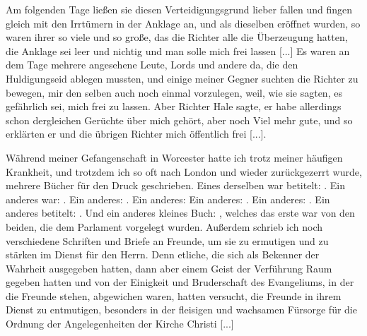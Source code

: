 Am folgenden Tage ließen sie diesen Verteidigungsgrund
lieber fallen und fingen gleich mit den Irrtümern in der Anklage
an, und als dieselben eröffnet wurden, so waren ihrer so viele
und so große, das die Richter alle die Überzeugung hatten,
die Anklage sei leer und nichtig und man solle mich frei
lassen [...] Es waren an dem Tage mehrere angesehene Leute,
Lords und andere da, die den Huldigungseid ablegen mussten, und
einige meiner Gegner suchten die Richter zu bewegen, mir den
selben auch noch einmal vorzulegen, weil, wie sie sagten, es 
gefährlich sei, mich frei zu lassen. Aber Richter Hale sagte, er habe
allerdings schon dergleichen Gerüchte über mich gehört, aber noch
Viel mehr gute, und so erklärten er und die übrigen Richter mich
öffentlich frei [...].

Während meiner Gefangenschaft in Worcester hatte ich trotz
meiner häufigen Krankheit, und trotzdem ich so oft nach London
und wieder zurückgezerrt wurde, mehrere Bücher für den Druck
geschrieben. Eines derselben war betitelt: . Ein anderes war: .
Ein anderes: . Ein anderes: 
 Ein anderes: . Ein anderes:
. Ein anderes
betitelt: . Und ein anderes kleines
Buch: , welches 
das erste war von den beiden,
die dem Parlament vorgelegt wurden. Außerdem schrieb ich noch
verschiedene Schriften und Briefe an Freunde, um sie zu 
ermutigen und zu stärken im Dienst für den Herrn. Denn etliche,
die sich als Bekenner der Wahrheit ausgegeben hatten, dann
aber einem Geist der Verführung Raum gegeben hatten und von
der Einigkeit und Bruderschaft des Evangeliums, in der die
Freunde stehen, abgewichen waren, hatten versucht, die Freunde
in ihrem Dienst zu entmutigen, besonders in der fleisigen und
wachsamen Fürsorge für die Ordnung der Angelegenheiten der
Kirche Christi [...]

